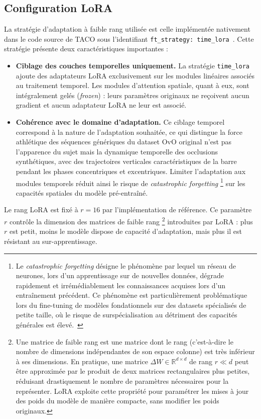 \subsection{Configuration LoRA}

La stratégie d'adaptation à faible rang utilisée est celle implémentée nativement dans le code source de TACO sous l'identifiant \texttt{ft\_strategy: time\_lora}~\cite{TACO-2025}. Cette stratégie présente deux caractéristiques importantes :

\begin{itemize}
  \item \textbf{Ciblage des couches temporelles uniquement.} La stratégie \texttt{time\_lora} ajoute des adaptateurs LoRA exclusivement sur les modules linéaires associés au traitement temporel. Les modules d'attention spatiale, quant à eux, sont intégralement gelés (\textit{frozen}) : leurs paramètres originaux ne reçoivent aucun gradient et aucun adaptateur LoRA ne leur est associé.

  \item \textbf{Cohérence avec le domaine d'adaptation.} Ce ciblage temporel correspond à la nature de l'adaptation souhaitée, ce qui distingue la force athlétique des séquences génériques du dataset OvO original n'est pas l'apparence du sujet mais la dynamique temporelle des occlusions synthétiques, avec des trajectoires verticales caractéristiques de la barre pendant les phases concentriques et excentriques. Limiter l'adaptation aux modules temporels réduit ainsi le risque de \emph{catastrophic forgetting} \footnote{Le \textit{catastrophic forgetting} désigne le phénomène par lequel un réseau de neurones, lors d'un apprentissage sur de nouvelles données, dégrade rapidement et irrémédiablement les connaissances acquises lors d'un entraînement précédent. Ce phénomène est particulièrement problématique lors du fine-tuning de modèles fondationnels sur des datasets spécialisés de petite taille, où le risque de surspécialisation au détriment des capacités générales est élevé.~\cite{catastrophic-forgetting-2015}} sur les capacités spatiales du modèle pré-entraîné.
\end{itemize}

Le rang LoRA est fixé à $r=16$ par l'implémentation de référence. Ce paramètre $r$ contrôle la dimension des matrices de faible rang \footnote{Une matrice de faible rang est une matrice dont le rang (c'est-à-dire le nombre de dimensions indépendantes de son espace colonne) est très inférieur à ses dimensions. En pratique, une matrice $\Delta W \in \mathbb{R}^{d \times d}$ de rang $r \ll d$ peut être approximée par le produit de deux matrices rectangulaires plus petites, réduisant drastiquement le nombre de paramètres nécessaires pour la représenter. LoRA exploite cette propriété pour paramétrer les mises à jour des poids du modèle de manière compacte, sans modifier les poids originaux.} introduites par LoRA : plus $r$ est petit, moins le modèle dispose de capacité d'adaptation, mais plus il est résistant au sur-apprentissage.

